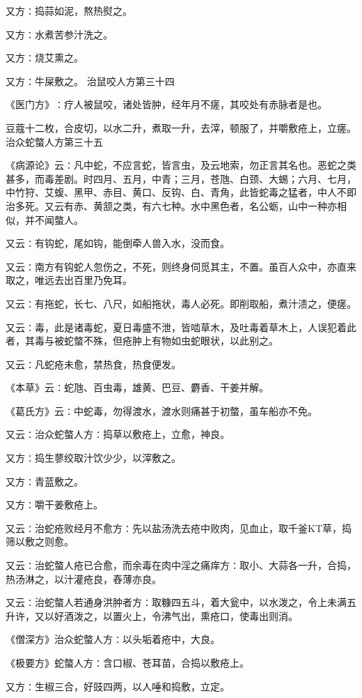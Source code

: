 \documentclass[a4paper,12pt,UTF8,twoside]{ctexbook}
\begin{document}
又方∶捣蒜如泥，熬热熨之。

又方∶水煮苦参汁洗之。

又方∶烧艾熏之。

又方∶牛屎敷之。
治鼠咬人方第三十四

《医门方》∶疗人被鼠咬，诸处皆肿，经年月不瘥，其咬处有赤脉者是也。

豆蔻十二枚，合皮切，以水二升，煮取一升，去滓，顿服了，并嚼敷疮上，立瘥。
治众蛇螫人方第三十五

《病源论》云∶凡中蛇，不应言蛇，皆言虫，及云地索，勿正言其名也。恶蛇之类甚多，而毒差剧。时四月、五月，中青；三月，苍虺、白颈、大蜴；六月、七月，中竹狩、艾蝮、黑甲、赤目、黄口、反钩、白、青角，此皆蛇毒之猛者，中人不即治多死。又云有赤、黄颔之类，有六七种。水中黑色者，名公蛎，山中一种亦相似，并不闻螫人。

又云∶有钩蛇，尾如钩，能倒牵人兽入水，没而食。

又云∶南方有钩蛇人忽伤之，不死，则终身伺觅其主，不置。虽百人众中，亦直来取之，唯远去出百里乃免耳。

又云∶有拖蛇，长七、八尺，如船拖状，毒人必死。即削取船，煮汁渍之，便瘥。

又云∶毒，此是诸毒蛇，夏日毒盛不泄，皆啮草木，及吐毒着草木上，人误犯着此者，其毒与被蛇螫不殊，但疮肿上有物如虫蛇眼状，以此别之。

又云∶凡蛇疮未愈，禁热食，热食便发。

《本草》云∶蛇虺、百虫毒，雄黄、巴豆、麝香、干姜并解。

《葛氏方》云∶中蛇毒，勿得渡水，渡水则痛甚于初螫，虽车船亦不免。

又云∶治众蛇螫人方∶捣草以敷疮上，立愈，神良。

又方∶捣生蓼绞取汁饮少少，以滓敷之。

又方∶青蓝敷之。

又方∶嚼干姜敷疮上。

又云∶治蛇疮败经月不愈方∶先以盐汤洗去疮中败肉，见血止，取千釜KT草，捣筛以敷之则愈。

又云∶治蛇螫人疮已合愈，而余毒在肉中淫之痛痒方∶取小、大蒜各一升，合捣，热汤淋之，以汁灌疮良，舂薄亦良。

又云∶治蛇螫人若通身洪肿者方∶取糠四五斗，着大瓮中，以水泼之，令上未满五升许，又以好酒泼之，以置火上，令沸气出，熏疮口，使毒出则消。

《僧深方》治众蛇螫人方∶以头垢着疮中，大良。

《极要方》蛇螫人方∶含口椒、苍耳苗，合捣以敷疮上。

又方∶生椒三合，好豉四两，以人唾和捣敷，立定。
\end{document}
